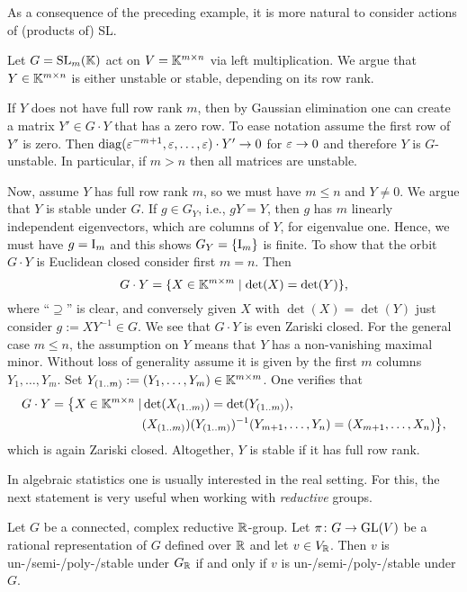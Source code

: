 As a consequence of the preceding example, it is more natural to consider actions of (products of) SL.

\begin{example}\label{ex:SLactionOnKmTimesn}
	Let $G = \operatorname{SL}_m(\mathbb K)$ act on $V = \mathbb K^{m \times n}$ via left multiplication. We argue that $Y \in \mathbb K^{m \times n}$ is either unstable or stable, depending on its row rank.
	
	If $Y$ does not have full row rank $m$, then by Gaussian elimination one can create a matrix $Y' \in G \cdot Y$ that has a zero row. To ease notation assume the first row of $Y'$ is zero. Then $\operatorname{diag}(\varepsilon^{-m+1}, \varepsilon, \ldots, \varepsilon) \cdot Y' \to 0$ for $\varepsilon \to 0$ and  
	therefore $Y$ is $G$-unstable. In particular, if $m > n$ then all matrices are unstable.
	
	Now, assume $Y$ has full row rank $m$, so we must have $m \leq n$ and $Y \neq 0$. We argue that $Y$ is stable under $G$. If $g \in G_Y$, i.e., $gY = Y$, then $g$ has $m$ linearly independent eigenvectors, which are columns of $Y$, for eigenvalue one. Hence, we must have $g =\operatorname{I}_m$ and this shows $G_Y = \{\operatorname{I}_m\}$ is finite. To show that the orbit $G \cdot Y$ is Euclidean closed consider first $m = n$. Then
		\[ G \cdot Y = \{ X \in \mathbb K^{m \times m} \mid \det(X) = \det(Y)\}, \]
	where ``$\supseteq$'' is clear, and conversely given $X$ with $\det(X) =\det(Y)$ just consider $g := XY^{-1} \in G$. We see that $G \cdot Y$ is even Zariski closed. For the general case $m \leq n$, the assumption on $Y$ means that $Y$ has a non-vanishing maximal minor. Without loss of generality assume it is given by the first $m$ columns $Y_1,\ldots,Y_m$. Set $Y_{(1..m)} := (Y_1, \ldots, Y_m) \in \mathbb K^{m \times m}$. One verifies that
		\begin{align*}
			G \cdot Y = \big\{ X \in \mathbb K^{m \times n} \mid &\det(X_{(1..m)}) = \det(Y_{(1..m)}), \\ 
			&(X_{(1..m)})(Y_{(1..m)})^{-1} (Y_{m+1},\ldots,Y_n) = (X_{m+1},\ldots,X_n) \big\} ,
		\end{align*}
	which is again Zariski closed.
	Altogether, $Y$ is stable if it has full row rank.
	\hfill\exSymbol
\end{example}

In algebraic statistics one is usually interested in the real setting. For this, the next statement is very useful when working with \emph{reductive} groups.

\begin{prop}\label{prop:Prop2-21-DM}
	Let $G$ be a connected, complex reductive $\mathbb R$-group. Let $\pi \colon G \to \operatorname{GL}(V)$ be a rational representation of $G$ defined over $\mathbb R$ and let $v \in V_\mathbb R$. Then $v$ is un-/semi-/poly-/stable under $G_\mathbb R$ if and only if $v$ is un-/semi-/poly-/stable under $G$.
\end{prop}



